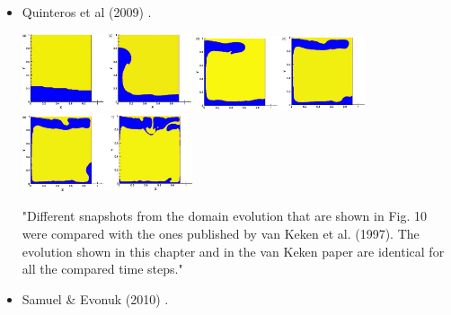 \begin{itemize}
\item Quinteros et al (2009) \cite{qurj09}.

\begin{center}
\includegraphics[width=5cm]{images/benchmark_vaks97/qurj09_a}
\includegraphics[width=5cm]{images/benchmark_vaks97/qurj09_b}
\includegraphics[width=5cm]{images/benchmark_vaks97/qurj09_c}
\end{center}


"Different snapshots from the domain evolution that are shown in Fig. 10 were compared with the ones published by van Keken et al. (1997). The evolution shown in this chapter and in the van Keken paper are identical for all the compared time steps."




\item Samuel \& Evonuk (2010) \cite{saev10}.


\end{itemize}
